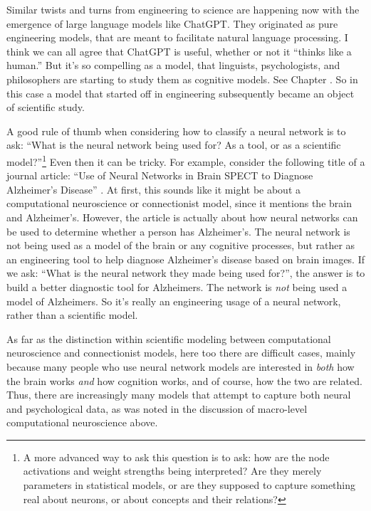 Similar twists and turns from engineering to science are happening now with the emergence of large language models like ChatGPT. They originated as pure engineering models, that are meant to facilitate natural language processing. I think we can all agree that ChatGPT is useful, whether or not it ``thinks like a human.'' But it's so compelling as a model, that linguists, psychologists, and philosophers are starting to study them as cognitive models.  See Chapter . So in this case a model that started off in engineering subsequently became an object of scientific study.

A good rule of thumb when considering how to classify a neural network is to ask: ``What is the neural network being used for? As a tool, or as a scientific model?''\footnote{A more advanced way to ask this question is to ask: how are the node activations and weight strengths being interpreted? Are they merely parameters in statistical models, or are they supposed to capture something real about neurons, or about concepts and their relations?} Even then it can be tricky. For example, consider the following title of a journal article: ``Use of Neural Networks in Brain SPECT to Diagnose Alzheimer's Disease'' \cite{page1996use}. At first, this sounds like it might be about a computational neuroscience or connectionist model, since it mentions the brain and Alzheimer's. However, the article is actually about how neural networks can be used to determine whether a person has Alzheimer's. The neural network is not being used as a model of the brain or any cognitive processes, but rather as an engineering tool to help diagnose Alzheimer's disease based on brain images. If we ask: ``What is the neural network they made being used for?'', the answer is to build a better diagnostic tool for Alzheimers. The network is \emph{not} being used a model of Alzheimers. So it's really an engineering usage of a neural network, rather than a scientific model.

As far as the distinction within scientific modeling between computational neuroscience and connectionist models, here too there are difficult cases, mainly because many people who use neural network models are interested in \emph{both} how the brain works \emph{and} how cognition works, and of course, how the two are related. Thus, there are increasingly many models that attempt to capture both neural and psychological data, as was noted in the discussion of macro-level computational neuroscience above. 

